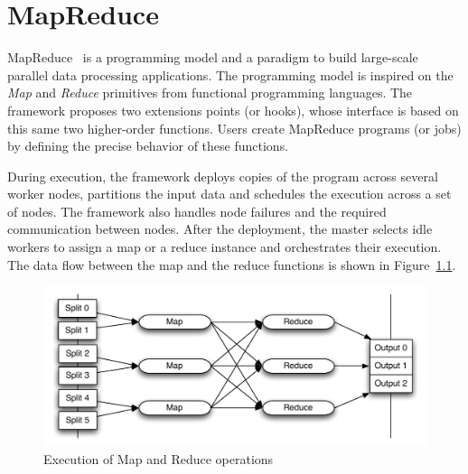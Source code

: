 \chapter{MapReduce} %
\label{cha:background}


MapReduce~\cite{dean:2008} is a programming model and a paradigm to build
large-scale parallel data processing applications. The programming model is inspired
on the \textit{Map} and \textit{Reduce} primitives from functional programming
languages. The framework proposes two extensions points (or hooks), whose interface
is based on this same two higher-order functions. Users create MapReduce programs
(or jobs) by defining the precise behavior of these functions.

During execution, the framework deploys copies of the program across several
worker nodes, partitions the input data and schedules the execution across a set
of nodes. The framework also handles node failures and the required communication
between nodes. After the deployment, the master selects idle workers to assign a
map or a reduce instance and orchestrates their execution. The data flow between
the map and the reduce functions is shown in Figure~\ref{fig:mrexecute}.

\begin{figure}[htbp]
	\centering
	\includegraphics[width=\columnwidth]{img/mapreduce-en.pdf}
	\caption{Execution of Map and Reduce operations}\label{fig:mrexecute}
\end{figure}

